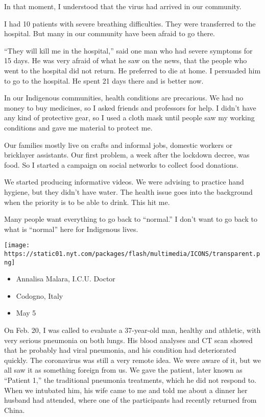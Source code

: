 In that moment, I understood that the virus had arrived in our
community.

I had 10 patients with severe breathing difficulties. They were
transferred to the hospital. But many in our community have been afraid
to go there.

``They will kill me in the hospital,'' said one man who had severe
symptoms for 15 days. He was very afraid of what he saw on the news,
that the people who went to the hospital did not return. He preferred to
die at home. I persuaded him to go to the hospital. He spent 21 days
there and is better now.

In our Indigenous communities, health conditions are precarious. We had
no money to buy medicines, so I asked friends and professors for help. I
didn't have any kind of protective gear, so I used a cloth mask until
people saw my working conditions and gave me material to protect me.

Our families mostly live on crafts and informal jobs, domestic workers
or bricklayer assistants. Our first problem, a week after the lockdown
decree, was food. So I started a campaign on social networks to collect
food donations.

We started producing informative videos. We were advising to practice
hand hygiene, but they didn't have water. The health issue goes into the
background when the priority is to be able to drink. This hit me.

Many people want everything to go back to ``normal.'' I don't want to go
back to what is ``normal'' here for Indigenous lives.

\texttt{[image: https://static01.nyt.com/packages/flash/multimedia/ICONS/transparent.png]}

\begin{itemize}
\tightlist
\item
  Annalisa Malara, I.C.U. Doctor
\item
  Codogno, Italy
\item
  May 5
\end{itemize}

On Feb. 20, I was called to evaluate a 37-year-old man, healthy and
athletic, with very serious pneumonia on both lungs. His blood analyses
and CT scan showed that he probably had viral pneumonia, and his
condition had deteriorated quickly. The coronavirus was still a very
remote idea. We were aware of it, but we all saw it as something foreign
from us. We gave the patient, later known as ``Patient 1,'' the
traditional pneumonia treatments, which he did not respond to. When we
intubated him, his wife came to me and told me about a dinner her
husband had attended, where one of the participants had recently
returned from China.


